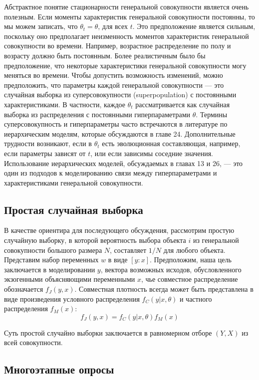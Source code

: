 Абстрактное понятие стационарности генеральной совокупности является очень полезным. Если моменты характеристик генеральной совокупности постоянны, то мы можем записать, что $\theta_{t}=\theta$, для всех $t$.  Это предположение является сильным, поскольку оно предполагает неизменность моментов характеристик генеральной совокупности во времени. Например, возрастное распределение по полу и возрасту должно быть постоянным. 
Более реалистичным было бы предположение, что некоторые характеристики генеральной совокупности могу меняться во времени. 
Чтобы допустить возможность изменений, можно предположить, что параметры каждой генеральной совокупности --- это случайная выборка из суперсовокупности (superpopulation) с постоянными характеристиками. В частности, каждое $\theta_{t}$ рассматривается как случайная выборка из  распределения  с постоянными гиперпараметрами $\theta$. 
Термины суперсовокупность и гиперпараметры часто встречаются в литературе по иерархическим моделям, которые обсуждаются в главе 24. 
Дополнительные трудности возникают, если в $\theta_t$ есть эволюционная составляющая, например, если параметры зависят от $t$, или если зависимы соседние значения.
Использование иерархических моделей, обсуждаемых в главах 13 и 26, --- это один из подходов к моделированию связи между гиперпараметрами и  характеристиками генеральной совокупности.


\subsection{Простая случайная выборка}

В качестве ориентира для последующего обсуждения, рассмотрим простую случайную выборку, в которой вероятность выбора объекта $i$ из генеральной совокупности большого размера $N$, составляет $1/N$ для любого объекта. Представим набор переменных $w$ в виде $[y:x]$. Предположим, наша цель заключается в моделировании $y$, вектора возможных исходов, обусловленного  экзогенными объясняющими переменными $x$, чье совместное распределение обозначается $f_{J}(y,x)$. Совместная плотность всегда может быть представлена в виде произведения  условного распределения $f_{C}(y|x,\theta)$ и частного распределения $f_{M}(x)$:
\begin{equation}
f_{J}(y,x)=f_{C}(y|x,\theta)f_{M}(x)
\end{equation}

Суть простой случайно выборки заключается в равномерном отборе $(Y,X)$ из всей совокупности.


\subsection{Многоэтапные опросы}

